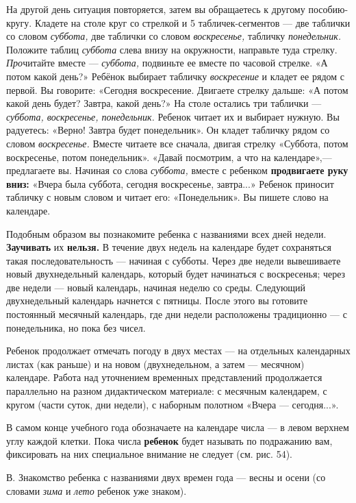 \documentclass[a5paper]{book}
\renewcommand{\emph}[1]{\textit{#1}}
\begin{document}
На другой день ситуация повторяется, затем вы обращаетесь к другому
пособию-кругу. Кладете на столе круг со стрелкой и 5 табличек-сегментов
--- две таблички со словом \emph{суббота,} две таблички со словом
\emph{воскресенье,} табличку \emph{понедельник.} Положите таблиц
\emph{суббота} слева внизу на окружности, направьте туда стрелку.
\emph{Про}читайте вместе --- \emph{суббота,} подвиньте ее вместе по
часовой стрелке. «А потом какой день?» Ребёнок выбирает табличку
\emph{воскресение} и кладет ее рядом с первой. Вы говорите: «Сегодня
воскресение. Двигаете стрелку дальше: «А потом какой день будет? Завтра,
какой день?» На столе остались три таблички --- \emph{суббота,
воскресенье, понедельник.} Ребенок читает их и выбирает нужную. Вы
радуетесь: «Верно! Завтра будет понедельник». Он кладет табличку рядом
со словом \emph{воскресенье.} Вместе читаете все сначала, двигая стрелку
«Суббота, потом воскресенье, потом понедельник». «Давай посмотрим, а что
на календаре»,--- предлагаете вы. Начиная со слова \emph{суббота,}
вместе с ребенком \textbf{продвигаете руку вниз:} «Вчера была суббота,
сегодня воскресенье, завтра...» Ребенок приносит табличку с новым словом
и читает его: «Понедельник». Вы пишете слово на календаре.

Подобным образом вы познакомите ребенка с названиями всех дней недели.
\textbf{Заучивать} их \textbf{нельзя.} В течение двух недель на
календаре будет сохраняться такая последовательность --- начиная с
субботы. Через две недели вывешиваете новый двухнедельный календарь,
который будет начинаться с воскресенья; через две недели --- новый
календарь, начиная неделю со среды. Следующий двухнедельный календарь
начнется с пятницы. После этого вы готовите постоянный месячный
календарь, где дни недели расположены традиционно --- с понедельника, но
пока без чисел.

Ребенок продолжает отмечать погоду в двух местах --- на отдельных
календарных листах (как раньше) и на новом (двухнедельном, а затем ---
месячном) календаре. Работа над уточнением временных представлений
продолжается параллельно на разном дидактическом материале: с месячным
календарем, с кругом (части суток, дни недели), с наборным полотном
«Вчера --- сегодня...».

В самом конце учебного года обозначаете на календаре числа --- в левом
верхнем углу каждой клетки. Пока числа \textbf{ребенок} будет называть
по подражанию вам, фиксировать на них специальное внимание не следует
(см. рис. 54).

В. Знакомство ребенка с названиями двух времен года --- весны и осени
(со словами \emph{зима} и \emph{лето} ребенок уже знаком).
\end{document}
